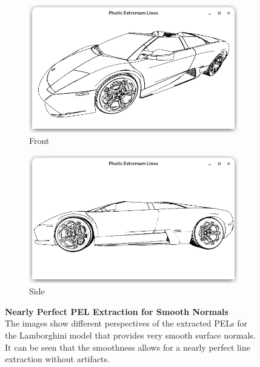 \documentclass[9pt,fleqn,twoside,twocolumn]{stdglobal}
\begin{document}
    \begin{figure}[h]
      \centering
      \begin{subfigure}[b]{\linewidth}
        \centering
        \includegraphics[width=\textwidth,trim={15px 15 15 50},clip]{images/lamborghini-front.png}
        \caption{Front}
      \end{subfigure}
      \begin{subfigure}[b]{\linewidth}
        \centering
        \includegraphics[width=\textwidth,trim={15px 15 15 50},clip]{images/lamborghini-side.png}
        \caption{Side}
      \end{subfigure}
      \caption{%
        \textbf{Nearly Perfect PEL Extraction for Smooth Normals}\\
        The images show different perspectives of the extracted PELs for the Lamborghini model that provides very smooth surface normals.
        It can be seen that the smoothness allows for a nearly perfect line extraction without artifacts.
      }
      \label{fig:preprocessing-normals-smooth}
    \end{figure}
\end{document}
